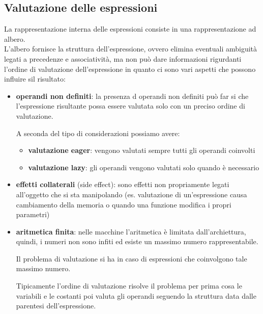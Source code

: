 \subsection{Valutazione delle espressioni}
La rappresentazione interna delle espressioni consiste in una rappresentazione ad albero.\\[0.2ex]
L'albero fornisce la struttura dell'espressione, ovvero elimina eventuali ambiguità legati a precedenze e associatività, ma non può dare informazioni rigurdanti l'ordine di valutazione dell'espressione in quanto ci sono vari aspetti che possono influire sil risultato:
\begin{itemize}[label=$\triangleright$, itemsep=\medskipamount]
    \item \textbf{operandi non definiti}: la presenza d operandi non definiti può far si che l'espressione risultante possa essere valutata solo con un preciso ordine di valutazione.
    

    A seconda del tipo di considerazioni possiamo avere:
    \begin{itemize}[label=$\Rightarrow$, itemsep=\smallskipamount]
        \item \textbf{valutazione eager}: vengono valutati sempre tutti gli operandi coinvolti
        \item \textbf{valutazione lazy}: gli operandi vengono valutati solo quando è necessario
    \end{itemize}
    \item \textbf{effetti collaterali} (side effect): sono effetti non propriamente legati all'oggetto che si sta manipolando (es. valutazione di un'espressione causa cambiamento della memoria o quando una funzione modifica i propri parametri)
    
    \item \textbf{aritmetica finita}: nelle macchine l'aritmetica è limitata dall'archiettura, quindi, i numeri non sono infiti ed esiste un massimo numero rappresentabile.
    
    Il problema di valutazione si ha in caso di espressioni che coinvolgono tale massimo numero.

    Tipicamente l'ordine di valutazione risolve il problema per prima cosa le variabili e le costanti poi valuta gli operandi seguendo la struttura data dalle parentesi dell'espressione.
\end{itemize}

